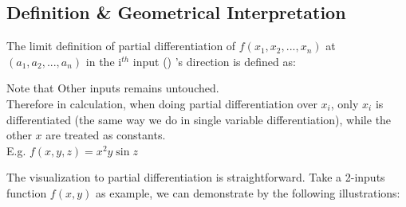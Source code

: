 \documentclass[class=article, crop=false, 12pt]{standalone}
\begin{document}
\subsection{Definition \& Geometrical Interpretation}

The limit definition of partial differentiation of $f(x_1, x_2,..., x_n)$ at $(a_1, a_2,...,a_n)$ in the i$^{th}$ input () 's direction is defined as:

Note that  Other inputs remains untouched.\\

Therefore in calculation, when doing partial differentiation over $x_i$,
only $x_i$ is differentiated (the same way we do in single variable differentiation), while the other $x$ are treated as constants.\\

E.g. $f(x,y,z) = x^2y\sin{z}$

The visualization to partial differentiation is straightforward. 
Take a 2-inputs function $f(x,y)$ as example, we can demonstrate by the following illustrations:
\end{document}
